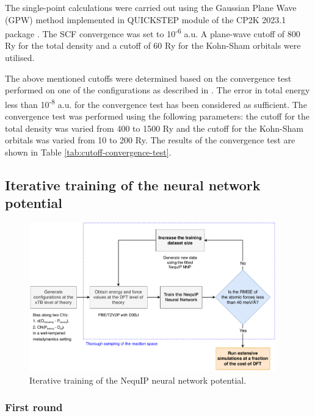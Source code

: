 The single-point calculations were carried out using the Gaussian Plane Wave (GPW) method  implemented in QUICKSTEP module \citep{vandevondeleQuickstepFastAccurate2005} of the CP2K 2023.1 package \citep{kuhneCP2KElectronicStructure2020}. The SCF convergence was set to 10\textsuperscript{-6} a.u. A plane-wave cutoff of 800 Ry for the total density and a cutoff of 60 Ry for the Kohn-Sham orbitals were utilised. 

The above mentioned cutoffs were determined based on the convergence test performed on one of the configurations as described in \citep{cp2k_developersHowConvergeCUTOFF}. The error in total energy less than 10\textsuperscript{-8} a.u. for the convergence test has been considered as sufficient. The convergence test was performed using the following parameters: the cutoff for the total density was varied from 400 to 1500 Ry and the cutoff for the Kohn-Sham orbitals was varied from 10 to 200 Ry. The results of the convergence test are shown in Table \ref{tab:cutoff-convergence-test}.



\subsection{Iterative training of the neural network potential}

\begin{figure}[hb]
    \centering
    \includegraphics[width=0.95\textwidth]{Figures/3_Computational_details/workflow_diagram_updated.pdf}
    \caption{Iterative training of the NequIP neural network potential.}
    \label{fig:iterative-training}
\end{figure}
\subsubsection{First round}

